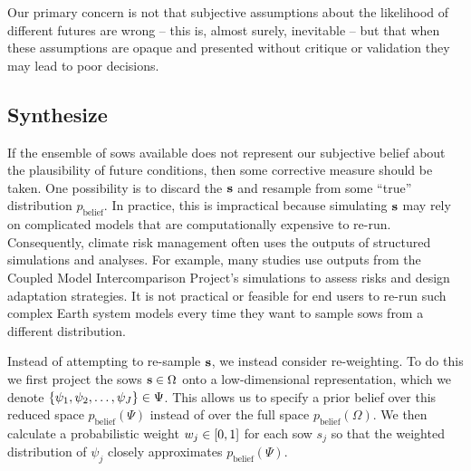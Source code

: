 \documentclass[11pt]{article}
\newcommand{\james}[1]{\todo[color=giallo, textcolor=nero]{\textbf{ATTN James:~}#1}} %
\begin{document}
Our primary concern is not that subjective assumptions about the likelihood of different futures are wrong -- this is, almost surely, inevitable -- but that when these assumptions are opaque and presented without critique or validation they may lead to poor decisions.

\subsection{Synthesize}\label{sec:analysis-synthesize}

If the ensemble of \glspl{sow} available does not represent our subjective belief about the plausibility of future conditions, then some corrective measure should be taken.
One possibility is to discard the $\vb{s}$ and resample from some ``true'' distribution $p_\mathrm{belief}$.
In practice, this is impractical because simulating $\vb{s}$ may rely on complicated models that are computationally expensive to re-run.
Consequently, climate risk management often uses the outputs of structured simulations and analyses.
For example, many studies use outputs from the Coupled Model Intercomparison Project's simulations \citep{meehl_cmip:2000} to assess risks and design adaptation strategies.\james{Add some refs}
It is not practical or feasible for end users to re-run such complex Earth system models every time they want to sample \glspl{sow} from a different distribution.

Instead of attempting to re-sample $\vb{s}$, we instead consider re-weighting.
To do this we first project the \glspl{sow} $\vb{s} \in \Omega$ onto a low-dimensional representation, which we denote $\qty{\psi_1, \psi_2, \ldots, \psi_J} \in \Psi$.
This allows us to specify a prior belief over this reduced space $p_\mathrm{belief}(\Psi)$ instead of over the full space $p_\mathrm{belief}(\Omega)$.
We then calculate a probabilistic weight $w_j \in \qty[0, 1]$ for each \gls{sow} $s_j$ so that the weighted distribution of $\psi_j$ closely approximates $p_\mathrm{belief}(\Psi)$.
\end{document}
